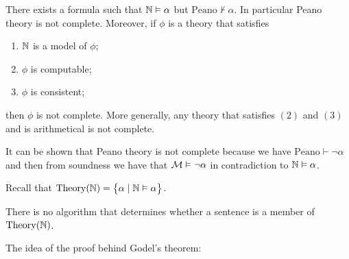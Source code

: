 \documentclass[11pt,a4paper]{article}
\DeclareRobustCommand{\models}{%
  \mathrel{\vDash}%
}
\begin{document}
\begin{theorem}
  There exists a formula such that $\N \models \alpha$ but 
  $\mathrm{Peano} \nvdash \alpha$.
  In particular Peano theory is not complete.
  Moreover, if $\phi$ is a theory that satisfies
  \begin{enumerate}
    \item[(1)] $\mathbb{N}$ is a model of $\phi$;
    \item[(2)] $\phi$ is computable;
    \item[(3)] $\phi$ is consistent;
  \end{enumerate}
  then $\phi$ is not complete.
  More generally, any theory that satisfies $(2)$ and $(3)$ and is
  arithmetical is not complete.
\end{theorem}
\begin{remark}
  It can be shown that Peano theory is not complete because
  we have $\mathrm{Peano} \vdash \neg \alpha$ and then from
  soundness we have that $\M \models \neg \alpha$ in contradiction
  to $\N \models \alpha$.
\end{remark}

Recall that $\Theory(\N) = \set{\alpha \mid \N \models \alpha}$.
\begin{proposition}
  There is no algorithm that determines whether a sentence is a member
  of $\operatorname{Theory}(\mathbb{N})$.
\end{proposition}

The idea of the proof behind Godel's theorem:
\end{document}
